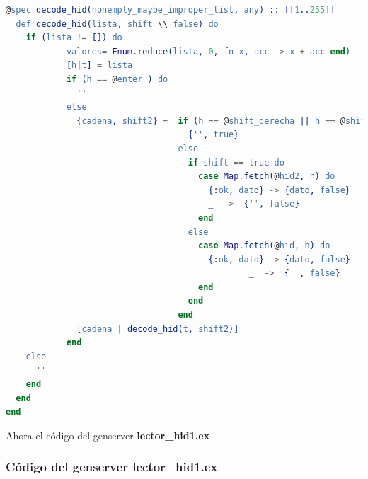 \begin{lstlisting}[language=erlang]
  @spec decode_hid(nonempty_maybe_improper_list, any) :: [[1..255]]
  def decode_hid(lista, shift \\ false) do
    if (lista != []) do
            valores= Enum.reduce(lista, 0, fn x, acc -> x + acc end)
            [h|t] = lista
            if (h == @enter ) do
              ''
            else
              {cadena, shift2} =  if (h == @shift_derecha || h == @shift_izquierda) && (valores > 0x20) do
                                    {'', true}
                                  else
                                    if shift == true do
                                      case Map.fetch(@hid2, h) do
                                        {:ok, dato} -> {dato, false}
                                        _  ->  {'', false}
                                      end
                                    else
                                      case Map.fetch(@hid, h) do
                                        {:ok, dato} -> {dato, false}
                                                _  ->  {'', false}
                                      end
                                    end
                                  end
              [cadena | decode_hid(t, shift2)]
            end
    else
      ''
    end
  end
end

\end{lstlisting}

Ahora el código del genserver \textbf{lector\_hid1.ex}

\subsubsection{Código del genserver lector\_hid1.ex}

